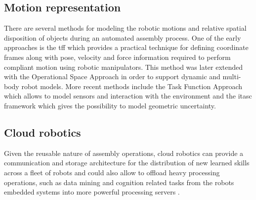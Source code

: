 \subsection{Motion representation}

There are several methods for modeling the robotic motions and relative spatial disposition of objects during an automated assembly process. One of the early approaches is the \gls{tff} \cite{Mason1981,Finkemeyer2004} which provides a practical technique for defining coordinate frames along with pose, velocity and force information required to perform compliant motion using robotic manipulators. This method was later extended with the Operational Space Approach \cite{Khatib1987,DeSapio2006} in order to support dynamic and multi-body robot models. More recent methods include the Task Function Approach \cite{Samson1991} which allows to model sensors and interaction with the environment and the \gls{itasc} framework \cite{DeSchutter-ijrr2007,Smits2010} which gives the possibility to model geometric uncertainty.


\subsection{Cloud robotics}

Given the reusable nature of assembly operations, cloud robotics can provide a communication and storage architecture for the distribution of new learned skills across a fleet of robots \cite{Tenorth2013,Stenmark2015T} and could also allow to offload heavy processing operations, such as data mining \cite{Witten2005} and cognition related tasks \cite{Beetz2010,Tenorth2013k,Saxena2014,Beetz2015} from the robots embedded systems into more powerful processing servers \cite{Hunziker2013}.




